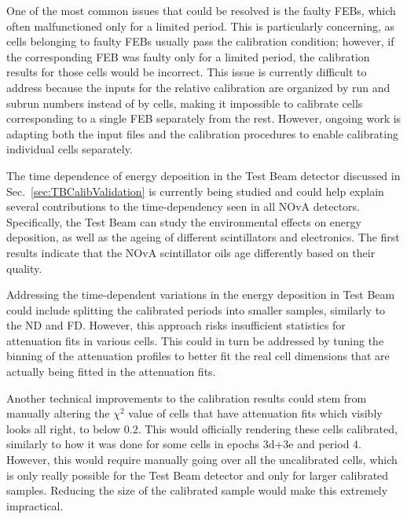 One of the most common issues that could be resolved is the faulty \glspl{FEB}, which often malfunctioned only for a limited period. This is particularly concerning, as cells belonging to faulty \glspl{FEB} usually pass the calibration condition; however, if the corresponding \gls{FEB} was faulty only for a limited period, the calibration results for those cells would be incorrect. This issue is currently difficult to address because the inputs for the relative calibration are organized by run and subrun numbers instead of by cells, making it impossible to calibrate cells corresponding to a single \gls{FEB} separately from the rest. However, ongoing work is adapting both the input files and the calibration procedures to enable calibrating individual cells separately.

The time dependence of energy deposition in the Test Beam detector discussed in Sec.~\ref{sec:TBCalibValidation} is currently being studied and could help explain several contributions to the time-dependency seen in all \gls{NOvA} detectors. Specifically, the Test Beam can study the environmental effects on energy deposition, as well as the ageing of different scintillators and electronics. The first results indicate that the \gls{NOvA} scintillator oils age differently based on their quality. 

Addressing the time-dependent variations in the energy deposition in Test Beam could include splitting the calibrated periods into smaller samples, similarly to the \gls{ND} and \gls{FD}. However, this approach risks insufficient statistics for attenuation fits in various cells. This could in turn be addressed by tuning the binning of the attenuation profiles to better fit the real cell dimensions that are actually being fitted in the attenuation fits.


Another technical improvements to the calibration results could stem from manually altering the $\chi^2$ value of cells that have attenuation fits which visibly looks all right, to below $0.2$. This would officially rendering these cells calibrated, similarly to how it was done for some cells in epochs 3d+3e and period 4. However, this would require manually going over all the uncalibrated cells, which is only really possible for the Test Beam detector and only for larger calibrated samples. Reducing the size of the calibrated sample would make this extremely impractical.

